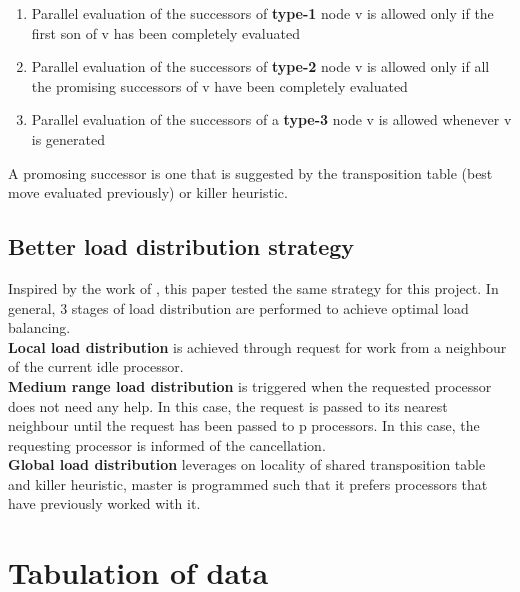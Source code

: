 \documentclass[12pt]{article}
\begin{document}
\begin{enumerate}
  \item Parallel evaluation of the successors of \textbf{type-1} node v is
    allowed only if the first son of v has been completely evaluated
  \item Parallel evaluation of the successors of \textbf{type-2} node v is
    allowed only if all the promising successors of v have been completely evaluated
  \item Parallel evaluation of the successors of a \textbf{type-3} node v is
    allowed whenever v is generated
\end{enumerate}

\noindent A promosing successor is one that is suggested by the transposition
table (best move evaluated previously) or killer heuristic.


\subsection{Better load distribution strategy}

Inspired by the work of \cite{feldmann1993game}, this paper tested the same
strategy for this project. In general, 3 stages of load distribution are
performed to achieve optimal load balancing. \\

\noindent \textbf{Local load distribution} is achieved through request for work
from a neighbour of the current idle processor. \\

\noindent \textbf{Medium range load distribution} is triggered when the
requested processor does not need any help. In this case, the request is passed
to its nearest neighbour until the request has been passed to p processors. In
this case, the requesting processor is informed of the cancellation. \\

\noindent \textbf{Global load distribution} leverages on locality of shared
transposition table and killer heuristic, master is programmed such that it
prefers processors that have previously worked with it.



\section{Tabulation of data}
\end{document}
